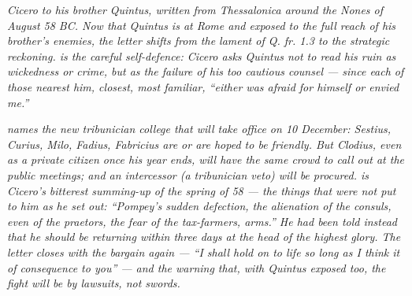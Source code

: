
\textit{Cicero to his brother Quintus, written from
Thessalonica around the Nones of August 58 BC. Now that
Quintus is at Rome and exposed to the full reach of his
brother's enemies, the letter shifts from the lament of
Q. fr. 1.3 to the strategic reckoning.  is the
careful self-defence: Cicero asks Quintus not to read his
ruin as wickedness or crime, but as the failure of his too
cautious counsel --- since each of those nearest him,
closest, most familiar, ``either was afraid for himself or
envied me.''}

\textit{ names the new tribunician college that
will take office on 10 December: Sestius, Curius, Milo,
Fadius, Fabricius are or are hoped to be friendly. But
Clodius, even as a private citizen once his year ends, will
have the same crowd to call out at the public meetings; and
an \textit{intercessor} (a tribunician veto) will be
procured.  is Cicero's bitterest summing-up of
the spring of 58 --- the things that were \textit{not} put to
him as he set out: ``Pompey's sudden defection, the
alienation of the consuls, even of the praetors, the fear of
the tax-farmers, arms.'' He had been told instead that he
should be returning within three days at the head of the
highest glory. The letter closes with the bargain again ---
``I shall hold on to life so long as I think it of consequence
to you'' --- and the warning that, with Quintus exposed too,
the fight will be by lawsuits, not swords.}
